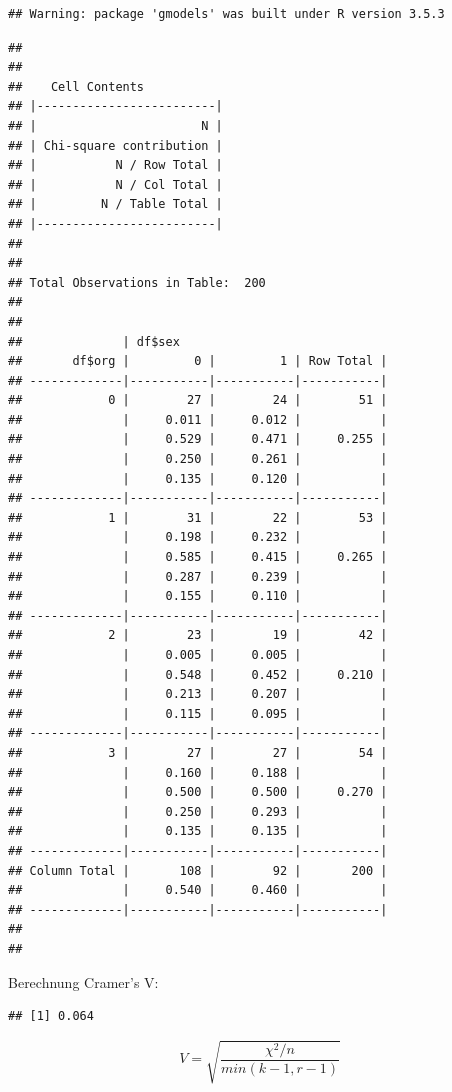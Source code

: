 \documentclass[
]{book}
\begin{document}
\begin{verbatim}
## Warning: package 'gmodels' was built under R version 3.5.3
\end{verbatim}

\begin{verbatim}
## 
##  
##    Cell Contents
## |-------------------------|
## |                       N |
## | Chi-square contribution |
## |           N / Row Total |
## |           N / Col Total |
## |         N / Table Total |
## |-------------------------|
## 
##  
## Total Observations in Table:  200 
## 
##  
##              | df$sex 
##       df$org |         0 |         1 | Row Total | 
## -------------|-----------|-----------|-----------|
##            0 |        27 |        24 |        51 | 
##              |     0.011 |     0.012 |           | 
##              |     0.529 |     0.471 |     0.255 | 
##              |     0.250 |     0.261 |           | 
##              |     0.135 |     0.120 |           | 
## -------------|-----------|-----------|-----------|
##            1 |        31 |        22 |        53 | 
##              |     0.198 |     0.232 |           | 
##              |     0.585 |     0.415 |     0.265 | 
##              |     0.287 |     0.239 |           | 
##              |     0.155 |     0.110 |           | 
## -------------|-----------|-----------|-----------|
##            2 |        23 |        19 |        42 | 
##              |     0.005 |     0.005 |           | 
##              |     0.548 |     0.452 |     0.210 | 
##              |     0.213 |     0.207 |           | 
##              |     0.115 |     0.095 |           | 
## -------------|-----------|-----------|-----------|
##            3 |        27 |        27 |        54 | 
##              |     0.160 |     0.188 |           | 
##              |     0.500 |     0.500 |     0.270 | 
##              |     0.250 |     0.293 |           | 
##              |     0.135 |     0.135 |           | 
## -------------|-----------|-----------|-----------|
## Column Total |       108 |        92 |       200 | 
##              |     0.540 |     0.460 |           | 
## -------------|-----------|-----------|-----------|
## 
## 
\end{verbatim}

Berechnung Cramer's V:

\begin{verbatim}
## [1] 0.064
\end{verbatim}

\[ V = \sqrt{\frac{\chi^2/n}{min(k-1, r-1)}}  \]
\end{document}

